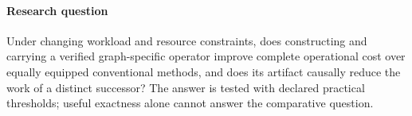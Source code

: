 \documentclass[11pt,letterpaper]{article}
\begin{document}
\paragraph{Research question} Under changing workload and resource constraints, does constructing and carrying a verified graph-specific operator improve complete operational cost over equally equipped conventional methods, and does its artifact causally reduce the work of a distinct successor? The answer is tested with declared practical thresholds; useful exactness alone cannot answer the comparative question.
\end{document}
